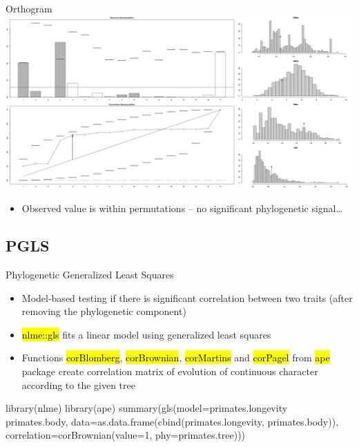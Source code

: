 \documentclass[compress, ucs, xelatex, 11pt, xcolor=svgnames,
  hyperref={
    bookmarks=true,
    unicode=true,
    colorlinks=true,
    pdftitle={Molecular data in R},
    plainpages=false,
    pdfauthor={Vojtech Zeisek},
    pdfsubject={Course about phylogeny and evolution in R},
    pdfcreator={XeLaTeX},
    pdfkeywords={R, evolution, phylogeny, molecular data},
    linkcolor=Tomato,
    anchorcolor=SaddleBrown,
    citecolor=Goldenrod,
    filecolor=DarkMagenta,
    menucolor=Sienna,
    urlcolor=DarkTurquoise,
    pdftex},
  url={hyphens, lowtilde} %
  ]{beamer}
\renewcommand{\texttt}[1]{\hl{\ttfamily #1}}
\begin{document}
\begin{frame}{Orthogram}
  \includegraphics[width=\textwidth]{orthogram.png}
  \begin{itemize}
    \item Observed value is within permutations -- no significant phylogenetic signal\ldots
  \end{itemize}
\end{frame}

\subsection{PGLS}

\begin{frame}[fragile]{Phylogenetic Generalized Least Squares}
  \begin{itemize}
    \item Model-based testing if there is significant correlation between two traits (after removing the phylogenetic component)
    \item \texttt{nlme::gls} fits a linear model using generalized least squares
    \item Functions \texttt{corBlomberg}, \texttt{corBrownian}, \texttt{corMartins} and \texttt{corPagel} from \texttt{ape} package create correlation matrix of evolution of continuous character according to the given tree
  \end{itemize}
  \begin{spluscode}
    library(nlme)
    library(ape)
    summary(gls(model=primates.longevity ~ primates.body,
      data=as.data.frame(cbind(primates.longevity, primates.body)),
      correlation=corBrownian(value=1, phy=primates.tree)))
  \end{spluscode}
\end{frame}
\end{document}
